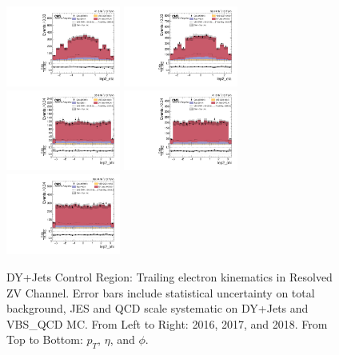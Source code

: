 \begin{figure}[!ht]
  \includegraphics[width=0.335\textwidth]{analysis_plots/2017_zjj/cr_vjets_e/lep2_eta.pdf} \hspace{-10pt}
  \includegraphics[width=0.335\textwidth]{analysis_plots/2018_zjj/cr_vjets_e/lep2_eta.pdf} \hspace{-10pt} \\
  \includegraphics[width=0.335\textwidth]{analysis_plots/2016_zjj/cr_vjets_e/lep2_phi.pdf} \hspace{-10pt}
  \includegraphics[width=0.335\textwidth]{analysis_plots/2017_zjj/cr_vjets_e/lep2_phi.pdf} \hspace{-10pt}
  \includegraphics[width=0.335\textwidth]{analysis_plots/2018_zjj/cr_vjets_e/lep2_phi.pdf} \hspace{-10pt} \\
  \caption[DY+Jets Control Region: Trailing electron kinematics in Resolved ZV Channel]%
  {DY+Jets Control Region: Trailing electron kinematics in Resolved ZV Channel.
    Error bars include statistical uncertainty on total background,
    JES and QCD scale systematic on DY+Jets and VBS\_QCD MC\@. From Left to Right: 2016,
    2017, and 2018. From Top to Bottom: \( p_T \), \( \eta \), and \( \phi \).}%
  \label{fig:zjj-cr-vjets-e-lep2-pt-eta-phi}
\end{figure}


